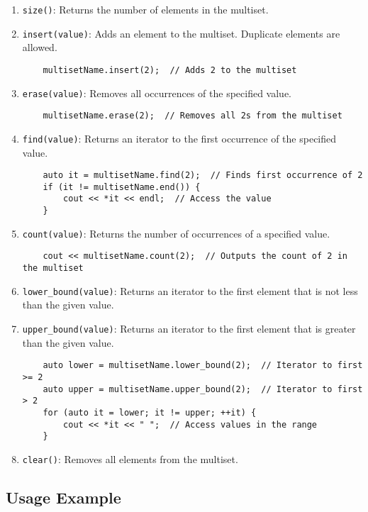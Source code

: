\documentclass{article}
\begin{document}
\begin{enumerate}
    \item \texttt{size()}: Returns the number of elements in the multiset.
    \item \texttt{insert(value)}: Adds an element to the multiset. Duplicate elements are allowed.
    \begin{lstlisting}
    multisetName.insert(2);  // Adds 2 to the multiset
    \end{lstlisting}
    \item \texttt{erase(value)}: Removes all occurrences of the specified value.
    \begin{lstlisting}
    multisetName.erase(2);  // Removes all 2s from the multiset
    \end{lstlisting}
    \item \texttt{find(value)}: Returns an iterator to the first occurrence of the specified value.
    \begin{lstlisting}
    auto it = multisetName.find(2);  // Finds first occurrence of 2
    if (it != multisetName.end()) {
        cout << *it << endl;  // Access the value
    }
    \end{lstlisting}
    \item \texttt{count(value)}: Returns the number of occurrences of a specified value.
    \begin{lstlisting}
    cout << multisetName.count(2);  // Outputs the count of 2 in the multiset
    \end{lstlisting}
    \item \texttt{lower\_bound(value)}: Returns an iterator to the first element that is not less than the given value.
    \item \texttt{upper\_bound(value)}: Returns an iterator to the first element that is greater than the given value.
    \begin{lstlisting}
    auto lower = multisetName.lower_bound(2);  // Iterator to first >= 2
    auto upper = multisetName.upper_bound(2);  // Iterator to first > 2
    for (auto it = lower; it != upper; ++it) {
        cout << *it << " ";  // Access values in the range
    }
    \end{lstlisting}
    \item \texttt{clear()}: Removes all elements from the multiset.
\end{enumerate}

\subsection{Usage Example}
\end{document}
